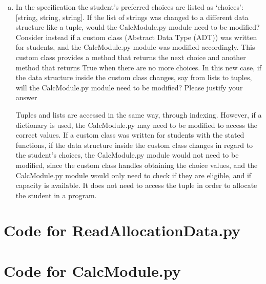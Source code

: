 \documentclass[12pt]{article}
\begin{document}
\begin{enumerate}[(a)]
\item In the specification the student's preferred choices are listed as `choices': [string, string, string]. If the list of strings was changed to a different data structure like a tuple, would the CalcModule.py module need to be modified? Consider instead if a custom class (Abstract Data Type (ADT)) was written for students, and the CalcModule.py module was modified accordingly. This custom class provides a method that returns the next choice and another method that returns True when there are no more choices. In this new case, if the data structure inside the custom class changes, say from lists to tuples, will the CalcModule.py module need to be modified? Please justify your answer

Tuples and lists are accessed in the same way, through indexing. However, if a dictionary is used, the CalcModule.py may need to be modified to access the correct values. If a custom class was written for students with the stated functions, if the data structure inside the custom class changes in regard to the student's choices, the CalcModule.py module would not need to be modified, since the custom class handles obtaining the choice values, and the CalcModule.py module would only need to check if they are eligible, and if capacity is available. It does not need to access the tuple in order to allocate the student in a program.

\end{enumerate}

\newpage

\lstset{language=Python, basicstyle=\tiny, breaklines=true, showspaces=false,
  showstringspaces=false, breakatwhitespace=true}

\def\thesection{\Alph{section}}

\section{Code for ReadAllocationData.py}

\noindent 

\newpage

\section{Code for CalcModule.py}

\noindent 
\end{document}
